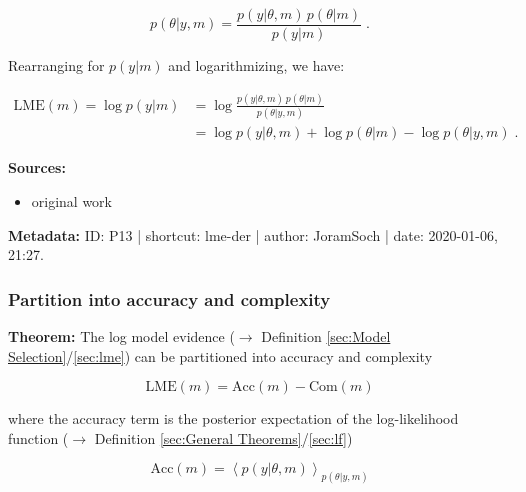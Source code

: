 \documentclass[a4paper,12pt,twoside]{book}
\begin{document}
\begin{equation} \label{eq:lme-der-BT}
p(\theta|y,m) = \frac{p(y|\theta,m) \, p(\theta|m)}{p(y|m)} \; .
\end{equation}

Rearranging for $p(y \vert m)$ and logarithmizing, we have:

\begin{equation} \label{eq:lme-der-LME-bayes-qed}
\begin{split}
\mathrm{LME}(m) = \log p(y|m) & = \log \frac{p(y|\theta,m) \, p(\theta|m)}{p(\theta|y,m)} \\
&= \log p(y|\theta,m) + \log p(\theta|m) - \log p(\theta|y,m) \; .
\end{split}
\end{equation}


\vspace{1em}
\textbf{Sources:}
\begin{itemize}
\item original work\end{itemize}


\vspace{1em}
\textbf{Metadata:} ID: P13 | shortcut: lme-der | author: JoramSoch | date: 2020-01-06, 21:27.
\vspace{1em}



\subsubsection[\textbf{Partition into accuracy and complexity}]{Partition into accuracy and complexity} \label{sec:lme-anc}
\setcounter{equation}{0}

\textbf{Theorem:} The log model evidence ($\rightarrow$ Definition \ref{sec:Model Selection}/\ref{sec:lme}) can be partitioned into accuracy and complexity

\begin{equation} \label{eq:lme-anc-LME}
\mathrm{LME}(m) = \mathrm{Acc}(m) - \mathrm{Com}(m)
\end{equation}

where the accuracy term is the posterior expectation of the log-likelihood function ($\rightarrow$ Definition \ref{sec:General Theorems}/\ref{sec:lf})

\begin{equation} \label{eq:lme-anc-Acc}
\mathrm{Acc}(m) = \left\langle p(y|\theta,m) \right\rangle_{p(\theta|y,m)}
\end{equation}
\end{document}
